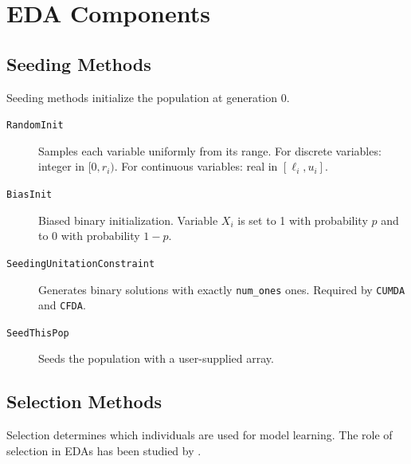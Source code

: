 \documentclass[a4paper,11pt]{article}
\begin{document}
\section{EDA Components}
\label{sec:components}

\subsection{Seeding Methods}

Seeding methods initialize the population at generation 0.

\begin{description}
  \item[\texttt{RandomInit}]
    Samples each variable uniformly from its range.
    For discrete variables: integer in $[0, r_i)$.
    For continuous variables: real in $[\ell_i, u_i]$.

  \item[\texttt{BiasInit}]
    Biased binary initialization.  Variable $X_i$ is set to 1 with probability
    $p$ and to 0 with probability $1-p$.

  \item[\texttt{SeedingUnitationConstraint}]
    Generates binary solutions with exactly \texttt{num\_ones} ones.
    Required by \texttt{CUMDA} and \texttt{CFDA}.

  \item[\texttt{SeedThisPop}]
    Seeds the population with a user-supplied array.
\end{description}

\subsection{Selection Methods}

Selection determines which individuals are used for model learning.
The role of selection in EDAs has been studied by
\citet{Johnson_and_Shapiro:2002,Lima_et_al:2007,Mahnig_and_Muehlenbein:2001,Santana_et_al:2005b}.
\end{document}
